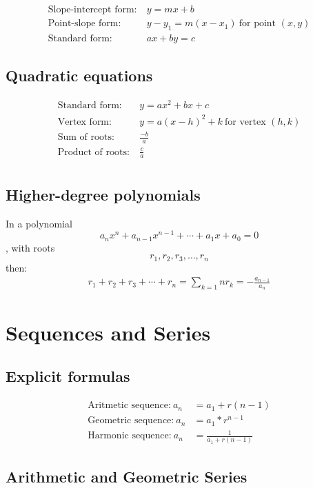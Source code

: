 \[\begin{aligned}
	\text{Slope-intercept form:}&~y = mx + b \\
	\text{Point-slope form:}&~y - y_1 = m(x - x_1)~\text{for point $(x, y)$} \\
	\text{Standard form:}&~ax + by = c
\end{aligned}\]


\subsection{Quadratic equations}

\[\begin{aligned}
	\text{Standard form:}&~y = ax^2 + bx + c \\
	\text{Vertex form:}&~y = a(x-h)^2 + k~\text{for vertex $(h, k)$} \\
	\text{Sum of roots:}&~\frac{-b}{a} \\
	\text{Product of roots:}&~\frac{c}{a} \\
\end{aligned}\]

\subsection{Higher-degree polynomials}
In a polynomial
\[
	a_n x^n + a_{n-1} x^{n-1} + \dotsb + a_1 x + a_0 = 0
\]
, with roots
\[
	r_1, r_2, r_3, \dotsc , r_n
\]
then:
\[\begin{aligned}
	r_1 + r_2 + r_3 + \dotsb + r_n = \sum_{k=1}{n} r_k = -\frac{a_{n-1}}{a_n}
\end{aligned}\]

\columnbreak

\section{Sequences and Series}

\subsection{Explicit formulas}
\[\begin{aligned}
	\text{Aritmetic sequence:}~a_n &= a_1 + r(n - 1) \\
	\text{Geometric sequence:}~a_n &= a_1 * r^{n - 1} \\
	\text{Harmonic sequence:}~a_n &= \frac{1}{a_1 + r(n - 1)}
\end{aligned}\]

\subsection{Arithmetic and Geometric Series}

